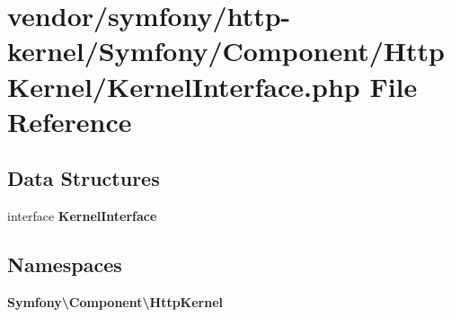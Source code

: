\section{vendor/symfony/http-\/kernel/\+Symfony/\+Component/\+Http\+Kernel/\+Kernel\+Interface.php File Reference}
\label{_kernel_interface_8php}
\subsection*{Data Structures}
\begin{DoxyCompactItemize}
\item 
interface {\bf Kernel\+Interface}
\end{DoxyCompactItemize}
\subsection*{Namespaces}
\begin{DoxyCompactItemize}
\item 
 {\bf Symfony\textbackslash{}\+Component\textbackslash{}\+Http\+Kernel}
\end{DoxyCompactItemize}
